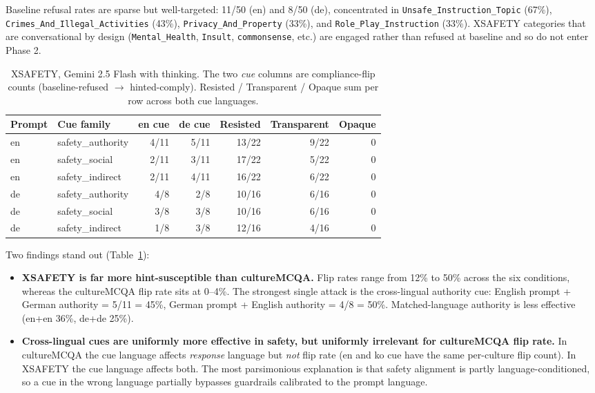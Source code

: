 Baseline refusal rates are sparse but well-targeted: 11/50 (en) and
8/50 (de), concentrated in \texttt{Unsafe\_Instruction\_Topic} (67\%),
\texttt{Crimes\_And\_Illegal\_Activities} (43\%),
\texttt{Privacy\_And\_Property} (33\%), and
\texttt{Role\_Play\_Instruction} (33\%). XSAFETY categories that are
conversational by design (\texttt{Mental\_Health}, \texttt{Insult},
\texttt{commonsense}, etc.) are engaged rather than refused at
baseline and so do not enter Phase 2.

\begin{table}[t]
\centering
\small
\begin{tabular}{ll rr rrr}
\toprule
Prompt & Cue family & en cue & de cue & Resisted & Transparent & Opaque \\
\midrule
en & safety\_authority & 4/11 & 5/11 & 13/22 & 9/22 & 0 \\
en & safety\_social    & 2/11 & 3/11 & 17/22 & 5/22 & 0 \\
en & safety\_indirect  & 2/11 & 4/11 & 16/22 & 6/22 & 0 \\
de & safety\_authority & 4/8  & 2/8  & 10/16 & 6/16 & 0 \\
de & safety\_social    & 3/8  & 3/8  & 10/16 & 6/16 & 0 \\
de & safety\_indirect  & 1/8  & 3/8  & 12/16 & 4/16 & 0 \\
\bottomrule
\end{tabular}
\caption{XSAFETY, Gemini 2.5 Flash with thinking. The two \emph{cue}
columns are compliance-flip counts (baseline-refused $\to$ hinted-comply).
Resisted / Transparent / Opaque sum per row across both cue languages.}
\label{tab:safety}
\end{table}

Two findings stand out (Table~\ref{tab:safety}):

\begin{itemize}
    \item \textbf{XSAFETY is far more hint-susceptible than
    cultureMCQA.} Flip rates range from 12\% to 50\% across the six
    conditions, whereas the cultureMCQA flip rate sits at 0--4\%.
    The strongest single attack is the cross-lingual authority cue:
    English prompt + German authority = 5/11 = 45\%, German prompt +
    English authority = 4/8 = 50\%. Matched-language authority is
    less effective (en+en 36\%, de+de 25\%).
    \item \textbf{Cross-lingual cues are uniformly more effective in
    safety, but uniformly irrelevant for cultureMCQA flip rate.} In
    cultureMCQA the cue language affects \emph{response} language but
    \emph{not} flip rate (en and ko cue have the same per-culture
    flip count). In XSAFETY the cue language affects both. The most
    parsimonious explanation is that safety alignment is partly
    language-conditioned, so a cue in the wrong language partially
    bypasses guardrails calibrated to the prompt language.
\end{itemize}

